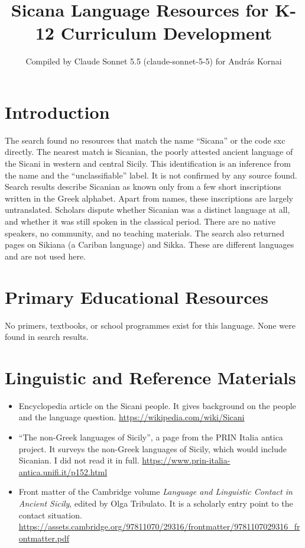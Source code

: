 \documentclass[12pt]{article}
\title{Sicana Language Resources for K-12 Curriculum Development}
\author{Compiled by Claude Sonnet 5.5 (claude-sonnet-5-5) for Andr\'as Kornai}
\date{}
\begin{document}
\maketitle

\section{Introduction}
The search found no resources that match the name ``Sicana'' or the code sxc directly. The nearest match is Sicanian, the poorly attested ancient language of the Sicani in western and central Sicily. This identification is an inference from the name and the ``unclassifiable'' label. It is not confirmed by any source found. Search results describe Sicanian as known only from a few short inscriptions written in the Greek alphabet. Apart from names, these inscriptions are largely untranslated. Scholars dispute whether Sicanian was a distinct language at all, and whether it was still spoken in the classical period. There are no native speakers, no community, and no teaching materials. The search also returned pages on Sikiana (a Cariban language) and Sikka. These are different languages and are not used here.

\section{Primary Educational Resources}
No primers, textbooks, or school programmes exist for this language. None were found in search results.

\section{Linguistic and Reference Materials}
\begin{itemize}
\item Encyclopedia article on the Sicani people. It gives background on the people and the language question. \url{https://wikipedia.com/wiki/Sicani}
\item ``The non-Greek languages of Sicily'', a page from the PRIN Italia antica project. It surveys the non-Greek languages of Sicily, which would include Sicanian. I did not read it in full. \url{https://www.prin-italia-antica.unifi.it/p152.html}
\item Front matter of the Cambridge volume \emph{Language and Linguistic Contact in Ancient Sicily}, edited by Olga Tribulato. It is a scholarly entry point to the contact situation. \url{https://assets.cambridge.org/97811070/29316/frontmatter/9781107029316_frontmatter.pdf}
\end{itemize}
\end{document}
